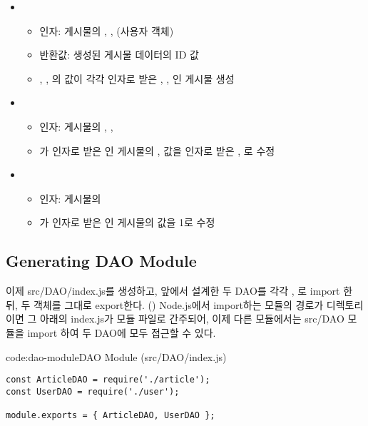 \begin{itemize}
\begin{itemize}
    \end{itemize}
    \item {}
    \begin{itemize}
        \item 인자: 게시물의 , ,  (사용자 객체)
        \item 반환값: 생성된 게시물 데이터의 ID 값
        \item {}, , 의 값이 각각 인자로 받은 , , 인 게시물 생성
    \end{itemize}
    \item {}
    \begin{itemize}
        \item 인자: 게시물의 , , 
        \item {}가 인자로 받은 인 게시물의 ,  값을 인자로 받은 , 로 수정
    \end{itemize}
    \item {}
    \begin{itemize}
        \item 인자: 게시물의 
        \item {}가 인자로 받은 인 게시물의  값을 1로 수정
    \end{itemize}
\end{itemize}

\subsection*{Generating DAO Module}

이제 src/DAO/index.js를 생성하고, 앞에서 설계한 두 DAO를 각각 , 로 import 한 뒤, 두 객체를 그대로 export한다. () Node.js에서 import하는 모듈의 경로가 디렉토리이면 그 아래의 index.js가 모듈 파일로 간주되어, 이제 다른 모듈에서는 src/DAO 모듈을 import 하여 두 DAO에 모두 접근할 수 있다.

\begin{codeenv}{code:dao-module}{DAO Module (src/DAO/index.js)}\begin{verbatim}
const ArticleDAO = require('./article');
const UserDAO = require('./user');

module.exports = { ArticleDAO, UserDAO };
\end{verbatim}
\end{codeenv}
